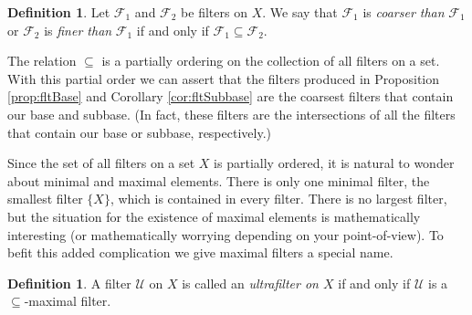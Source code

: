 \documentclass[12pt]{article}
\theoremstyle{plain}
\theoremstyle{definition}
\newtheorem{defn}[thm]{Definition}
\newcommand{\calF}{\mathcal{F}}
\newcommand{\calU}{\mathcal{U}}
\begin{document}
\begin{defn}
  Let $\calF_1$ and $\calF_2$ be filters on $X$.
  We say that $\calF_1$ is \textsl{coarser than} $\calF_1$ or $\calF_2$ is \textsl{finer than} $\calF_1$ if and only if $\calF_1 \subseteq \calF_2$.
\end{defn}

The relation $\subseteq$ is a partially ordering on the collection of all filters on a set.
With this partial order we can assert that the filters produced in Proposition \ref{prop:fltBase} and Corollary \ref{cor:fltSubbase} are the coarsest filters that contain our base and subbase.
(In fact, these filters are the intersections of all the filters that contain our base or subbase, respectively.)

Since the set of all filters on a set $X$ is partially ordered, it is natural to wonder about minimal and maximal elements.
There is only one minimal filter, the smallest filter $\{X\}$, which is contained in every filter. 
There is no largest filter, but the situation for the existence of maximal elements is mathematically interesting (or mathematically worrying depending on your point-of-view).
To befit this added complication we give maximal filters a special name.

\begin{defn}
  A filter $\calU$ on $X$ is called an \textsl{ultrafilter on $X$} if and only if $\calU$ is a \mbox{$\subseteq$-maximal} filter.
\end{defn}
\end{document}
